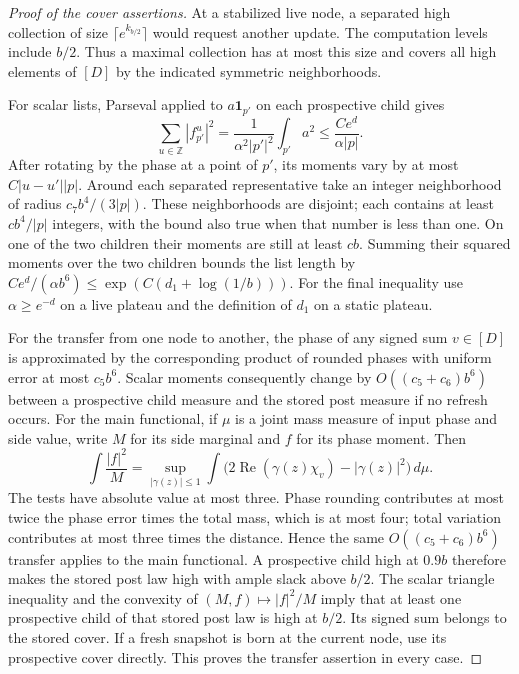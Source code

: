 \begin{proof}[Proof of the cover assertions]
At a stabilized live node, a separated high collection of size
$\lceil e^{k_{b/2}}\rceil$ would request another update. The computation
levels include $b/2$. Thus a maximal collection has at most this size and
covers all high elements of $[D]$ by the indicated symmetric neighborhoods.

For scalar lists, Parseval applied to $a\mathbf1_{p'}$ on each prospective
child gives
\[
 \sum_{u\in\mathbb Z}|f_{p'}^u|^2
 =\frac{1}{\alpha^2|p'|^2}\int_{p'}a^2
 \le\frac{C e^d}{\alpha|p|}.
\]
After rotating by the phase at a point of $p'$, its moments vary by at most
$C|u-u'||p|$. Around each separated representative take an integer
neighborhood of radius $c_7b^4/(3|p|)$. These neighborhoods are disjoint;
each contains at least $c b^4/|p|$ integers, with the bound also true when
that number is less than one. On one of the two children their moments are
still at least $c b$. Summing their squared moments over the two children
bounds the list length by
$C e^d/(\alpha b^6)\le\exp(C(d_1+\log(1/b)))$. For the final inequality
use $\alpha\ge e^{-d}$ on a live plateau and the definition of $d_1$ on a
static plateau.

For the transfer from one node to another, the phase of any signed sum
$v\in[D]$ is approximated by the corresponding product of rounded phases
with uniform error at most $c_5b^6$. Scalar moments consequently change by
$O((c_5+c_6)b^6)$ between a prospective child measure and the stored post
measure if no refresh occurs. For the main functional, if $\mu$ is a joint
mass measure of input phase and side value, write $M$ for its side marginal
and $f$ for its phase moment. Then
\begin{equation}\label{eq:07-bounded-test}
 \int\frac{|f|^2}{M}
 =\sup_{|\gamma(z)|\le1}
       \int\bigl(2\operatorname{Re}(\gamma(z)\chi_v)-|\gamma(z)|^2\bigr)
                         \,d\mu.
\end{equation}
The tests have absolute value at most three. Phase rounding contributes at
most twice the phase error times the total mass, which is at most four;
total variation contributes at most three times the distance. Hence the
same $O((c_5+c_6)b^6)$ transfer applies to the main functional. A prospective
child high at $0.9b$ therefore makes the stored post law high with ample
slack above $b/2$. The scalar triangle inequality and the convexity of
$(M,f)\mapsto |f|^2/M$ imply that at least one prospective child of that
stored post law is high at $b/2$. Its signed sum belongs to the stored
cover. If a fresh snapshot is born at the current node, use its prospective
cover directly. This proves the transfer assertion in every case.
\end{proof}

